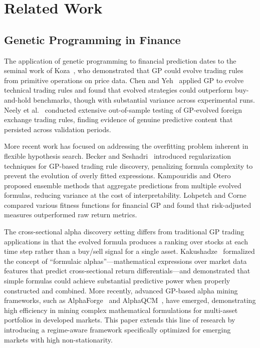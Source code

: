 \documentclass{ieeeaccess}
\newcommand{\revised}[1]{#1}
\begin{document}
\section{Related Work}
\label{sec:related}

\subsection{Genetic Programming in Finance}
The application of genetic programming to financial prediction dates to the seminal work of Koza~\cite{b6}, who demonstrated that GP could evolve trading rules from primitive operations on price data. Chen and Yeh~\cite{b8} applied GP to evolve technical trading rules and found that evolved strategies could outperform buy-and-hold benchmarks, though with substantial variance across experimental runs. Neely et al.~\cite{b9} conducted extensive out-of-sample testing of GP-evolved foreign exchange trading rules, finding evidence of genuine predictive content that persisted across validation periods.

More recent work has focused on addressing the overfitting problem inherent in flexible hypothesis search. Becker and Seshadri~\cite{b10} introduced regularization techniques for GP-based trading rule discovery, penalizing formula complexity to prevent the evolution of overly fitted expressions. Kampouridis and Otero~\cite{b11} proposed ensemble methods that aggregate predictions from multiple evolved formulas, reducing variance at the cost of interpretability. Lohpetch and Corne~\cite{b12} compared various fitness functions for financial GP and found that risk-adjusted measures outperformed raw return metrics.

The cross-sectional alpha discovery setting differs from traditional GP trading applications in that the evolved formula produces a ranking over stocks at each time step rather than a buy/sell signal for a single asset. Kakushadze~\cite{b13} formalized the concept of ``formulaic alphas''---mathematical expressions over market data features that predict cross-sectional return differentials---and demonstrated that simple formulas could achieve substantial predictive power when properly constructed and combined. \revised{More recently, advanced GP-based alpha mining frameworks, such as AlphaForge~\cite{b35} and AlphaQCM~\cite{b36}, have emerged, demonstrating high efficiency in mining complex mathematical formulations for multi-asset portfolios in developed markets. This paper extends this line of research by introducing a regime-aware framework specifically optimized for emerging markets with high non-stationarity.}
\end{document}
